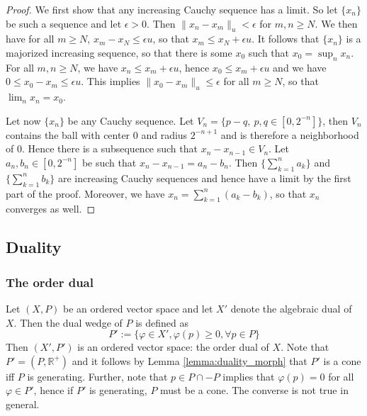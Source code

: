 \documentclass[12pt]{article}
\newtheorem{prop}{Proposition}
\theoremstyle{remark}
\newcommand{\<}{\langle}
\begin{document}
\begin{proof} We first show that any increasing Cauchy sequence has a limit. So let $\{x_n\}$ be such a sequence and let $\epsilon>0$. Then $\|x_n-x_m\|_u< \epsilon$ for $m,n\ge N$. We then have for all $m\ge N$, $x_m-x_N\le \epsilon u$, so that $x_m\le x_N+\epsilon u$. It follows that $\{x_n\}$ is a majorized increasing sequence, so that 
there is some $x_0$ such that $x_0=\sup_n x_n$. For all $m,n \ge N$, we have $x_n\le x_m+\epsilon u$, hence $x_0\le x_m+\epsilon u$ and we have 
$0\le x_0-x_m\le \epsilon u$. This implies $\|x_0-x_m\|_u\le \epsilon$ for all $m\ge N$, so that $\lim_n x_n=x_0$. 

Let now $\{x_n\}$ be any Cauchy sequence. Let $V_n=\{p-q,\ p,q\in [0,2^{-n}]\}$, then $V_n$ contains the ball with center 0 and radius $2^{-{n+1}}$ and is therefore a neighborhood of 0.  Hence there is a subsequence such that $x_n-x_{n-1}\in V_n$. Let $a_n,b_n\in [0,2^{-n}]$ be such that $x_n-x_{n-1}=a_n-b_n$. Then $\{\sum_{k=1}^n a_k\}$
 and $\{\sum_{k=1}^n b_k\}$ are increasing Cauchy sequences and hence have a limit by the first part of the proof. Moreover, we have 
$x_n=\sum_{k=1}^n(a_k-b_k)$, so that $x_n$ converges as well.



\end{proof}









\subsection{Duality}
\subsubsection*{The order dual}

Let $(X,P)$ be an ordered vector space and let $X'$ denote the algebraic dual of $X$. Then the dual wedge of $P$ is defined as
\[
P':=\{\varphi\in X', \varphi(p)\ge 0, \forall p\in P\}
\]
Then $(X',P')$ is an ordered vector space: the order dual of $X$. Note that  $P'=(P,\mathbb R^+)$ and it follows by  Lemma \ref{lemma:duality_morph} that 
	$P'$ is a cone iff $P$ is generating. Further, note that $p\in P\cap -P$ implies that $\varphi(p)=0$ for all $\varphi\in P'$, hence if $P'$ is generating, $P$ must be a cone. The converse is not true in general.
\end{document}
